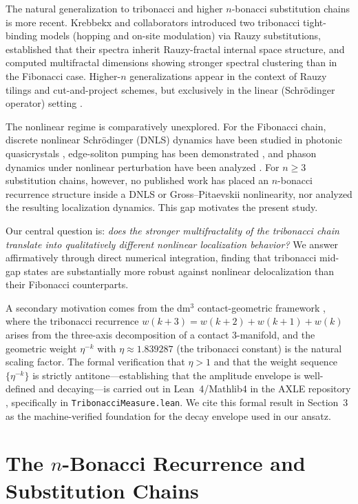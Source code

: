 \documentclass[12pt,a4paper]{article}
\begin{document}
The natural generalization to tribonacci and higher $n$-bonacci substitution
chains is more recent. Krebbekx and collaborators \cite{Krebbekx2023}
introduced two tribonacci tight-binding models (hopping and on-site
modulation) via Rauzy substitutions, established that their spectra inherit
Rauzy-fractal internal space structure, and computed multifractal dimensions
showing stronger spectral clustering than in the Fibonacci case.
Higher-$n$ generalizations appear in the context of Rauzy tilings and
cut-and-project schemes, but exclusively in the linear (Schr\"{o}dinger
operator) setting \cite{Bellissard1989,Damanik2008}.

The nonlinear regime is comparatively unexplored. For the Fibonacci chain,
discrete nonlinear Schr\"{o}dinger (DNLS) dynamics have been studied in
photonic quasicrystals \cite{Lahini2009}, edge-soliton pumping has been
demonstrated \cite{Jurgensen2021}, and phason dynamics under nonlinear
perturbation have been analyzed \cite{Verbin2015}. For $n \geq 3$
substitution chains, however, no published work has placed an $n$-bonacci
recurrence structure inside a DNLS or Gross--Pitaevskii nonlinearity, nor
analyzed the resulting localization dynamics. This gap motivates the present
study.

Our central question is: \emph{does the stronger multifractality of the
tribonacci chain translate into qualitatively different nonlinear localization
behavior?} We answer affirmatively through direct numerical integration,
finding that tribonacci mid-gap states are substantially more robust against
nonlinear delocalization than their Fibonacci counterparts.

A secondary motivation comes from the dm$^3$ contact-geometric framework
\cite{Grossi2026_Vol1,Grossi2026_Wavenumber6}, where the tribonacci
recurrence $w(k+3) = w(k+2) + w(k+1) + w(k)$ arises from the three-axis
decomposition of a contact 3-manifold, and the geometric weight $\eta^{-k}$
with $\eta \approx 1.839287$ (the tribonacci constant) is the natural scaling
factor. The formal verification that $\eta > 1$ and that the weight sequence
$\{\eta^{-k}\}$ is strictly antitone---establishing that the amplitude
envelope is well-defined and decaying---is carried out in Lean~4/Mathlib4 in
the AXLE repository \cite{AXLE2026}, specifically in
\texttt{TribonacciMeasure.lean}. We cite this formal result in Section~3 as
the machine-verified foundation for the decay envelope used in our ansatz.

\section{The $n$-Bonacci Recurrence and Substitution Chains}
\end{document}
